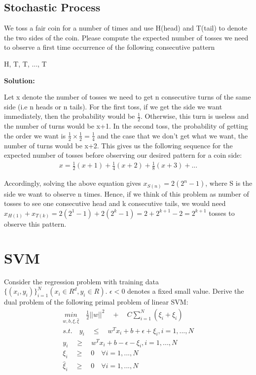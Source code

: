 \documentclass[12pt,a4paper]{article}
\begin{document}
	
	\subsection{Stochastic Process}
	\noindent We toss a fair coin for a number of times and use H(head) and T(tail) to denote the two sides of the coin. Please compute the expected number of tosses we need to observe a first time occurrence of the following consecutive pattern
	\begin{center}
		H, T, T, ..., T
	\end{center}
	\vspace{-0.2cm}
	
	\noindent \textbf{Solution:}
	\vspace{0.2cm}
	
	\noindent Let x denote the number of tosses we need to get n consecutive turns of the same side (i.e n heads or n tails). For the first toss, if we get the side we want immediately, then the probability would be $\frac{1}{2}$. Otherwise, this turn is useless and the number of turns would be x+1. In the second toss, the probability of getting the order we want is $\frac{1}{2}\times\frac{1}{2}=\frac{1}{4}$ and the case that we don't get what we want, the number of turns would be x+2. This gives us the following sequence for the expected number of tosses before observing our desired pattern for a coin side:
	\begin{align*}
		x=\frac{1}{2}(x+1)+\frac{1}{4}(x+2)+\frac{1}{8}(x+3)+...
	\end{align*}
	
	\noindent Accordingly, solving the above equation gives $x_{S(n)}=2(2^n-1)$, where S is the side we want to observe n times. Hence, if we think of this problem as number of tosses to see one consecutive head and k consecutive tails, we would need $x_{H(1)}+x_{T(k)}=2(2^1-1)+2(2^k-1)= 2+2^{k+1}-2 =2^{k+1}$ tosses to observe this pattern.
	
	\section{SVM}
	Consider the regression problem with training data $\{(x_i, y_i)\}_{i=1}^N (x_i \in R^d, y_i \in R)$. $\epsilon<0$ denotes a fixed small value. Derive the dual problem of the following primal problem of linear SVM:
	\begin{align*}
		\underset{w, b, \xi, \hat{\xi}}{min}\quad \frac{1}{2}||w||^2\quad+\quad C\sum_{i=1}^{N}(\xi_i+\hat{\xi}_i)\\
		s.t.\quad y_i\quad \leq \quad w^Tx_i+b+\epsilon+\xi_i, i=1,...,N \\	
		y_i\quad \geq\quad w^Tx_i+b-\epsilon-\xi_i, i=1,...,N\\
		\xi_i\quad\geq\quad 0\quad\forall i=1,...,N\qquad\qquad\quad\quad\\
		\hat{\xi}_i\quad\geq\quad 0\quad\forall i=1,...,N\qquad\qquad\quad\quad
	\end{align*}
	\vspace{-0.8cm}
	
\end{document}
